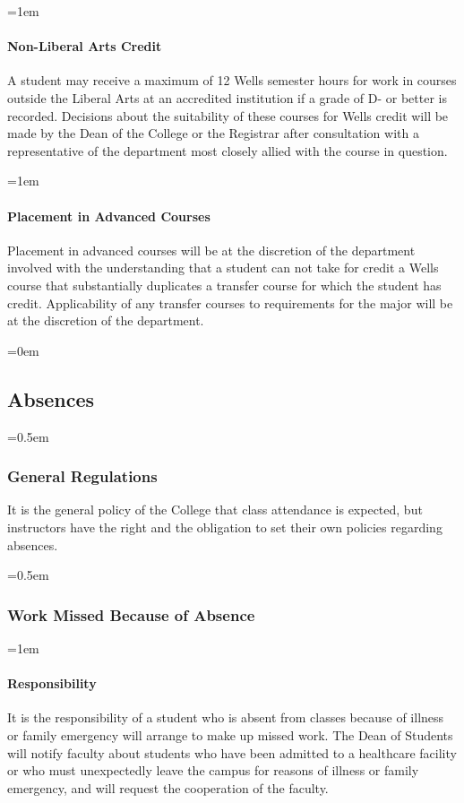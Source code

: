 \documentclass{manual}
\newcommand{\modified}[1]{}
\newcommand{\oldbreak}[1]{}
\let\oldsubsection\subsection
\renewcommand\subsection{\leftskip=0em\oldsubsection}
\let\oldsubsubsection\subsubsection
\renewcommand\subsubsection{\leftskip=0.5em\oldsubsubsection}
\let\oldparagraph\paragraph
\renewcommand\paragraph{\leftskip=1em\oldparagraph}
\begin{document}
\paragraph{Non-Liberal Arts Credit}
A student may receive a maximum of 12 Wells semester hours for work in courses outside the Liberal Arts at an accredited institution if a grade of D- or better is recorded. Decisions about the suitability of these courses for Wells credit will be made by the Dean of the College or the Registrar after consultation with a representative of the department most closely allied with the course in question.

\paragraph{Placement in Advanced Courses}
Placement in advanced courses will be at the discretion of the department involved with the understanding that a student can not take for credit a Wells course that substantially duplicates a transfer course for which the student has credit. Applicability of any transfer courses to requirements for the major will be at the discretion of the department.

\oldbreak{VIII - 1}

\subsection{Absences}

\subsubsection{General Regulations}\modified{5/14/02}

It is the general policy of the College that class attendance is expected, but instructors have the right and the obligation to set their own policies regarding absences.

\subsubsection{Work Missed Because of Absence}

\paragraph{Responsibility}
It is the responsibility of a student who is absent from classes because of illness or family emergency will arrange to make up missed work. The Dean of Students will notify faculty about students who have been admitted to a healthcare facility or who must unexpectedly leave the campus for reasons of illness or family emergency, and will request the cooperation of the faculty.
\end{document}
